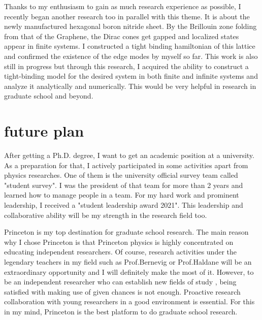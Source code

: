 \documentclass[a4]{article}
\begin{document}
Thanks to my enthusiasm to gain as much research experience as possible, I recently began another research too in parallel with this theme. It is about the newly manufactured hexagonal boron nitride sheet. By the Brillouin zone folding from that of the Graphene, the Dirac cones get gapped and localized states appear in finite systems. I constructed a tight binding hamiltonian of this lattice and confirmed the existence of the edge modes by myself so far. This work is also still in progress but through this research, I acquired the ability to construct a tight-binding model for the desired system in both finite and infinite systems and analyze it analytically and numerically. This would be very helpful in research in graduate school and beyond.\par


\section{future plan}
After getting a Ph.D. degree, I want to get an academic position at a university. As a preparation for that, I actively participated in some activities apart from physics researches. One of them is the university official survey team called "student survey". I was the president of that team for more than 2 years and learned how to manage people in a team. For my hard work and prominent leadership, I received a "student leadership award 2021". This leadership and collaborative ability will be my strength in the research field too.\par

Princeton is my top destination for graduate school research. The main reason why I chose Princeton is that Princeton physics is highly concentrated on educating independent researchers. Of course, research activities under the legendary teachers in my field such as Prof.Bernevig or Prof.Haldane will be an extraordinary opportunity and I will definitely make the most of it. However, to be an independent researcher who can establish new fields of study , being satisfied with making use of given chances is not enough. Proactive research collaboration with young researchers in a good environment is essential. For this in my mind, Princeton is the best platform to do graduate school research.
\end{document}
